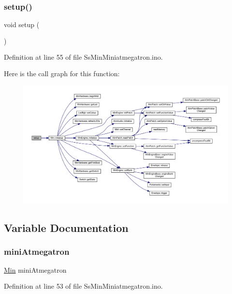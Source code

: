 \subsubsection{\texorpdfstring{setup()}{setup()}}
{\footnotesize\ttfamily void setup (\begin{DoxyParamCaption}{ }\end{DoxyParamCaption})}



Definition at line 55 of file Ss\+Min\+Miniatmegatron.\+ino.

Here is the call graph for this function\+:
\nopagebreak
\begin{figure}[H]
\begin{center}
\leavevmode
\includegraphics[width=350pt]{d1/d54/_ss_min_miniatmegatron_8ino_a4fc01d736fe50cf5b977f755b675f11d_cgraph}
\end{center}
\end{figure}


\subsection{Variable Documentation}
\mbox{\label{_ss_min_miniatmegatron_8ino_a75f390a8ad79e74fbf5ebf8f798e92e0}} 
\subsubsection{\texorpdfstring{mini\+Atmegatron}{miniAtmegatron}}
{\footnotesize\ttfamily \hyperlink{class_min}{Min} mini\+Atmegatron}



Definition at line 53 of file Ss\+Min\+Miniatmegatron.\+ino.


